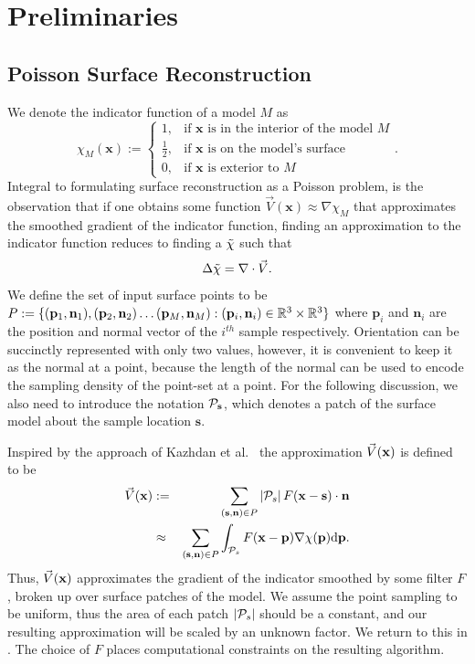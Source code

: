 \section{Preliminaries}\label{sec:pois_review}
\subsection{Poisson Surface Reconstruction}
We denote the indicator function of a model $M$ as $$ \chi_M(\mathbf{x}) :=
\begin{cases}
1, & \text{if }\mathbf{x}\text{ is in the interior of the model } M \\
\frac{1}{2}, & \text{if } \mathbf{x}\text{ is on the model's surface}\\
0, & \text{if }\mathbf{x}\text{ is exterior to } M
\end{cases}. $$
Integral to formulating surface reconstruction as a Poisson problem, is the observation that if one obtains some function $\vec{V}(\mathbf{x})\approx{\nabla}\chi_M$ that approximates the smoothed gradient of the indicator function, finding an approximation to the indicator function reduces to finding a $\tilde{\chi}$ such that {\small 
\begin{equation} \label{eq:poisson}
	\lapl{\inda} = {\grad} \cdot \vec{V}.
\end{equation}}
We define the set of input surface points to be $P:=\{(\mathbf{p}_1,\mathbf{n}_1), (\mathbf{p}_2,\mathbf{n}_2) \hdots (\mathbf{p}_M,\mathbf{n}_M) : (\mathbf{p}_i,\mathbf{n}_i) \in
\mathbb{R}^3 \times \mathbb{R}^3 \}$ where $\mathbf{p}_i$ and $\mathbf{n}_i$ are the position and normal vector of the $i^{th}$ sample respectively. Orientation can be succinctly represented with only two values, however, it is convenient to keep it as the normal at a point, because the length of the normal can be used to encode the sampling density of the point-set at a point. For the following discussion, we also need to introduce the notation $\mathcal{P}_{\mathbf{s}}$, which denotes a patch of the surface model about the sample location $\mathbf{s}$. 

Inspired by the approach of Kazhdan et al.~\cite{Kazhdan06} the approximation $\vec{V}(\mathbf{x})$ is defined to be  {\small 
\begin{eqnarray}
	\vec{V}(\vx) & := & \sum_{(\mathbf{s},\mathbf{n}) \in P}\left|\patch_s\right|F(\vx-\mathbf{s})\cdot\vn \label{eq:vdef} \\
	 & \approx & \sum_{(\mathbf{s},\mathbf{n}) \in P} \int_{\patch_s}{F(\mathbf{x} - \mathbf{p}) \nabla \chi (\mathbf{p})} \mathrm{d} \mathbf{p}. \notag  
\end{eqnarray}}
Thus, $\vec{V}(\mathbf{x})$ approximates the gradient of the indicator smoothed by some filter $F$, broken up over surface patches of the model. We assume the point sampling to be uniform, thus the area of each patch $\left|\mathcal{P}_s\right|$ should be a constant, and our resulting approximation will be scaled by an unknown factor. We return to this in . The choice of $F$ places computational constraints on the resulting algorithm.

